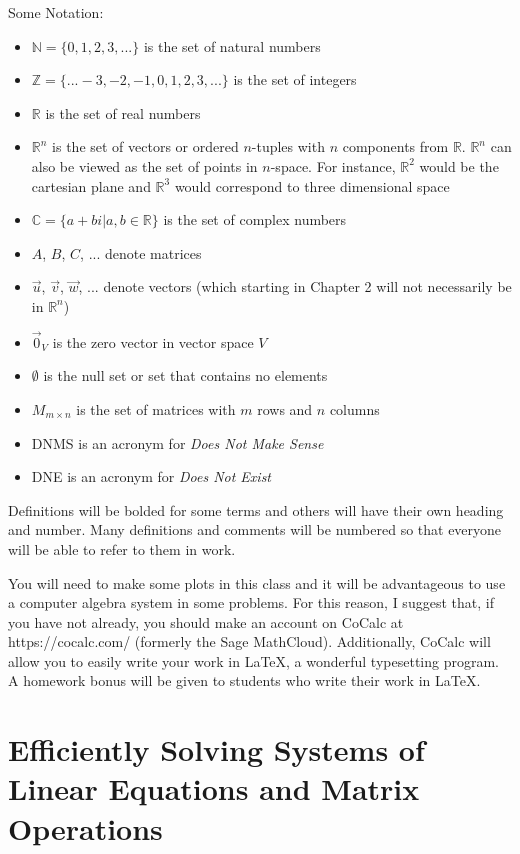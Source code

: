 Some Notation:
\begin{itemize}
\item $\mathbb{N}=\{0,1,2,3,...\}$ is the set of natural numbers
\item $\mathbb{Z}=\{...-3,-2,-1,0,1,2,3,...\}$ is the set of integers
\item $\mathbb{R}$ is the set of real numbers
\item $\mathbb{R}^n$ is the set of vectors or ordered $n$-tuples with $n$ components from $\mathbb{R}$. $\mathbb{R}^n$ can also be viewed as the set of points in $n$-space. For instance, $\mathbb{R}^2$ would be the cartesian plane and $\mathbb{R}^3$ would correspond to three dimensional space
\item $\mathbb{C}=\{a+b i | a,b \in \mathbb{R}\}$ is the set of complex numbers
\item $A$, $B$, $C$, ... denote matrices
\item $\vec{u}$, $\vec{v}$, $\vec{w}$, ... denote vectors (which starting in Chapter 2 will not necessarily be in $\mathbb{R}^n$)
\item $\vec{0}_V$ is the zero vector in vector space $V$
\item $\emptyset$ is the null set or set that contains no elements
\item $M_{m \times n}$ is the set of matrices with $m$ rows and $n$ columns
\item DNMS is an acronym for \textit{Does Not Make Sense}
\item DNE is an acronym for \textit{Does Not Exist}
\end{itemize}
Definitions will be bolded for some terms and others will have their own heading and number. Many definitions and comments will be numbered so that everyone will be able to refer to them in work.

You will need to make some plots in this class and it will be advantageous to use a computer algebra system in some problems. For this reason, I suggest that, if you have not already, you should make an account on CoCalc at https://cocalc.com/ (formerly the Sage MathCloud). Additionally, CoCalc will allow you to easily write your work in LaTeX, a wonderful typesetting program. A homework bonus will be given to students who write their work in LaTeX.


\mainmatter

\chapter{Efficiently Solving Systems of Linear Equations and Matrix Operations}


